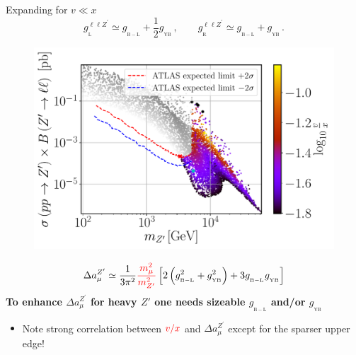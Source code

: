 \documentclass[10pt,xcolor=dvipsnames,mathserif]{beamer}
\renewcommand{\(}{\left(}
\renewcommand{\)}{\right)}
\renewcommand{\[}{\left[}
\renewcommand{\]}{\right]}
\newcommand{\g}[2]{g_{_\mathrm{#1}}^{#2}}
\newcommand{\red}[0]{\color{red}}
\begin{document}
\begin{frame}
Expanding for $v \ll x$
$$\g{L}{\ell \ell Z^\prime} \simeq \g{B-L}{} + \dfrac{1}{2} \g{YB}{}\,,
\qquad
\g{R}{\ell \ell Z^\prime} \simeq \g{B-L}{} + \g{YB}{}\,.$$
\vskip-5mm
\begin{figure}[!h]
	\includegraphics[scale=0.35
	]{mZp_Xsec_VEV.pdf}
\end{figure}	
$$\Delta a_\mu^{Z^\prime} \simeq \dfrac{1}{3 \pi^2} {\red \dfrac{m_\mu^2}{m_{Z^\prime}^2}} \[2\(g_{_\mathrm{B-L}}^{2} + g_{_\mathrm{YB}}^{2}\) + 3 g_{_\mathrm{B-L}}^{} g_{_\mathrm{YB}}^{} \]$$
\textbf{To enhance $\Delta a_\mu^{Z^\prime}$ for heavy $Z'$ one needs sizeable $g_{_\mathrm{B-L}}$ and/or $g_{_\mathrm{YB}}$}
\begin{itemize}
	\item Note strong correlation between $\red v/x$ and $\Delta a_\mu^{Z^\prime}$ except for the sparser upper edge!
\end{itemize}
\end{frame}
\end{document}
